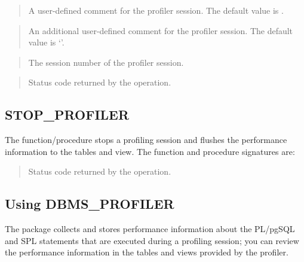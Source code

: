 \documentclass[letterpaper,10pt,english,openany,oneside]{sphinxmanual}
\begin{document}

\begin{quote}

A user-defined comment for the profiler session. The default value is
.
\end{quote}

\begin{quote}

An additional user-defined comment for the profiler session. The default
value is ‘’.
\end{quote}

\begin{quote}

The session number of the profiler session.
\end{quote}

\begin{quote}

Status code returned by the operation.
\end{quote}


\subsection{STOP\_PROFILER}
\label{\detokenize{dbms_profiler:stop-profiler}}
The  function/procedure stops a profiling session and
flushes the performance information to the  tables and
view. The function and procedure signatures are:
\begin{quote}


\end{quote}


\begin{quote}

Status code returned by the operation.
\end{quote}

\newpage


\subsection{Using DBMS\_PROFILER}
\label{\detokenize{dbms_profiler:using-dbms-profiler}}
The  package collects and stores performance information
about the PL/pgSQL and SPL statements that are executed during a
profiling session; you can review the performance information in the
tables and views provided by the profiler.
\end{document}

